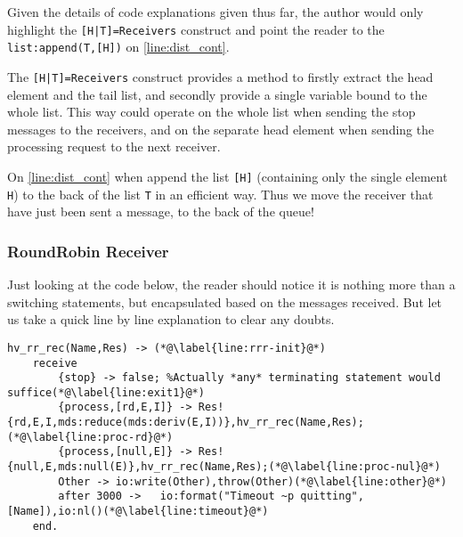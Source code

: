 Given the details of code explanations given thus far, the author
would only highlight the \texttt{[H|T]=Receivers} construct and
point the reader to the \texttt{list:append(T,[H])} on
\autoref{line:dist_cont}.

The \texttt{[H|T]=Receivers} construct provides a method to firstly
extract the head element and the tail list, and secondly provide a
single variable bound to the whole list. This way could operate on the
whole list when sending the stop messages to the receivers, and on the
separate head element when sending the processing request to the next
receiver.

On \autoref{line:dist_cont} when append the list \texttt{[H]}
(containing only the single element \texttt{H}) to the back of the
list \texttt{T} in an efficient way. Thus we move the receiver that
have just been sent a message, to the back of the queue!


\subsubsection{RoundRobin Receiver}
\label{sec:roundrobin-receiver}

Just looking at the code below, the reader should notice it is nothing
more than a switching statements, but encapsulated based on the
messages received. But let us take a quick line by line explanation to
clear any doubts.

\begin{lstlisting}[name=hvp2]
hv_rr_rec(Name,Res) -> (*@\label{line:rrr-init}@*)
	receive 
		{stop} -> false; %Actually *any* terminating statement would suffice(*@\label{line:exit1}@*)
		{process,[rd,E,I]} -> Res!{rd,E,I,mds:reduce(mds:deriv(E,I))},hv_rr_rec(Name,Res);(*@\label{line:proc-rd}@*)
		{process,[null,E]} -> Res!{null,E,mds:null(E)},hv_rr_rec(Name,Res);(*@\label{line:proc-nul}@*)
		Other -> io:write(Other),throw(Other)(*@\label{line:other}@*)
		after 3000 ->	io:format("Timeout ~p quitting",[Name]),io:nl()(*@\label{line:timeout}@*)
	end.
\end{lstlisting}

